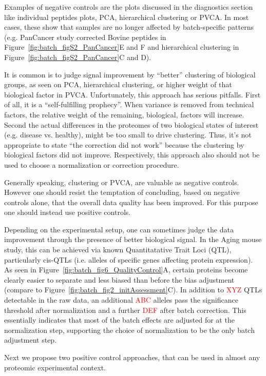 \documentclass[num-refs]{wiley-article}
\begin{document}
Examples of negative controls are the plots discussed in the diagnostics section like individual peptides plots, PCA, hierarchical clustering or PVCA. In most cases, these show that samples are no longer affected by batch-specific patterns (e.g. PanCancer study corrected Bovine peptides in Figure~\ref{fig:batch_figS2_PanCancer}E and F and hierarchical clustering in Figure~\ref{fig:batch_figS2_PanCancer}C and D).

It is common is to judge signal improvement by “better” clustering of biological groups, as seen on PCA, hierarchical clustering, or higher weight of that biological factor in PVCA. Unfortunately, this approach has serious pitfalls. First of all, it is a “self-fulfilling prophecy”. When variance is removed from technical factors, the relative weight of the remaining, biological, factors will increase. Second the actual differences in the proteomes of two biological states of interest (e.g. disease vs. healthy), might be too small to drive clustering. Thus, it’s not appropriate to state “the correction did not work” because the clustering by biological factors did not improve. Respectively, this approach also should not be used to choose a normalization or correction procedure.

Generally speaking, clustering or PVCA, are valuable as negative controls. However one should resist the temptation of concluding, based on negative controls alone, that the overall data quality has been improved. For this purpose one should instead use positive controls.

Depending on the experimental setup, one can sometimes judge the data improvement through the presence of better biological signal. In the Aging mouse study, this can be achieved via known Quantitatative Trait Loci (QTL), particularly cis-QTLs (i.e. alleles of specific genes  affecting protein expression). As seen in Figure~\ref{fig:batch_fig6_QualityControl}A, certain proteins become clearly easier to separate and less biased than before the bias adjustment (compare to Figure~\ref{fig:batch_fig2_initAssessment}C). In addition to \textcolor{red}{XYZ} QTLs detectable in the raw data, an additional \textcolor{red}{ABC} alleles pass the significance threshold after normalization and a further \textcolor{red}{DEF} after batch correction. This essentially indicates that most of the batch effects are adjusted for at the normalization step, supporting the choice of normalization to be the only batch adjustment step.

Next we propose two positive control approaches, that can be used in almost any proteomic experimental context.
\end{document}
